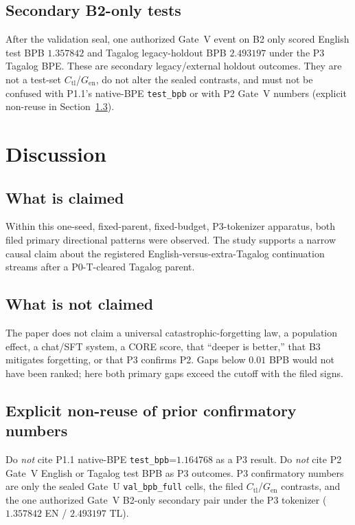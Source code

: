 \documentclass[11pt,a4paper]{article}
\begin{document}
\subsection{Secondary B2-only tests}
After the validation seal, one authorized Gate~V event on B2 only scored English test BPB $1.357842$ and Tagalog legacy-holdout BPB $2.493197$ under the P3 Tagalog BPE. These are secondary legacy/external holdout outcomes. They are not a test-set $C_{\mathrm{tl}}$/$G_{\mathrm{en}}$, do not alter the sealed contrasts, and must not be confused with P1.1's native-BPE \texttt{test\_bpb} or with P2 Gate~V numbers (explicit non-reuse in Section~\ref{sec:nonreuse}).

\section{Discussion}
\label{sec:discussion}

\subsection{What is claimed}
Within this one-seed, fixed-parent, fixed-budget, P3-tokenizer apparatus, both filed primary directional patterns were observed. The study supports a narrow causal claim about the registered English-versus-extra-Tagalog continuation streams after a P0-T-cleared Tagalog parent.

\subsection{What is not claimed}
The paper does not claim a universal catastrophic-forgetting law, a population effect, a chat/SFT system, a CORE score, that ``deeper is better,'' that B3 mitigates forgetting, or that P3 confirms P2. Gaps below $0.01$ BPB would not have been ranked; here both primary gaps exceed the cutoff with the filed signs.

\subsection{Explicit non-reuse of prior confirmatory numbers}
\label{sec:nonreuse}
Do \emph{not} cite P1.1 native-BPE \texttt{test\_bpb}=$1.164768$ as a P3 result. Do \emph{not} cite P2 Gate~V English or Tagalog test BPB as P3 outcomes. P3 confirmatory numbers are only the sealed Gate~U \texttt{val\_bpb\_full} cells, the filed $C_{\mathrm{tl}}$/$G_{\mathrm{en}}$ contrasts, and the one authorized Gate~V B2-only secondary pair under the P3 tokenizer ($1.357842$ EN / $2.493197$ TL).
\end{document}
